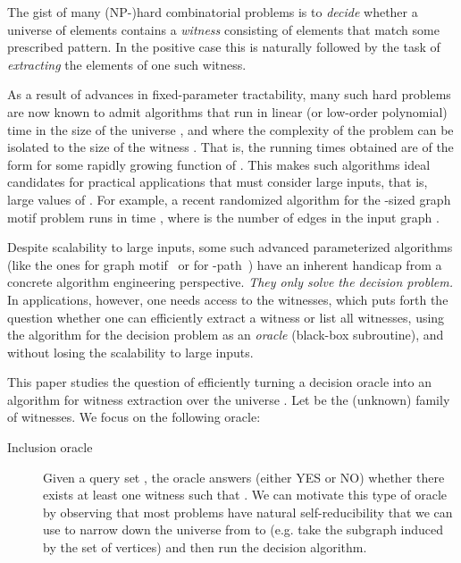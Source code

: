 \documentclass[11pt]{article}
\begin{document}
The gist of many (NP-)hard combinatorial problems is to {\em decide} 
whether a universe of  elements contains a {\em witness} consisting 
of  elements that match some prescribed pattern. In the positive case 
this is naturally followed by the task of {\em extracting} the elements 
of one such witness. 

As a result of advances in fixed-parameter tractability, 
many such hard problems are now known to admit algorithms that run
in linear (or low-order polynomial) time in the size of the universe
, and where the complexity of the problem can be isolated to
the size of the witness . That is, the running times obtained
are of the form  for some rapidly growing function 
 of . This makes such algorithms ideal candidates for 
practical applications that must consider large inputs, 
that is, large values of . For example, a recent randomized 
algorithm for the -sized graph motif problem runs in time 
, where  is the number of edges in 
the input graph \cite{BjorklundKaskiKowalik2013}. 

Despite scalability to large inputs, some such advanced parameterized 
algorithms (like the ones for graph motif~\cite{BjorklundKaskiKowalik2013} or for -path~\cite{BjorklundHusfeldtKaskiKoivisto2010}) have an inherent handicap from a concrete algorithm engineering
perspective. {\em They only solve the decision problem.}
In applications, however, one needs access to the witnesses,
which puts forth the question whether one can efficiently extract a
witness or list all witnesses, using the algorithm for the decision
problem as an {\em oracle} (black-box subroutine), and without losing 
the scalability to large inputs.

This paper studies the question of efficiently turning a decision oracle 
into an algorithm for witness extraction over the 
universe . Let  be the (unknown) family of witnesses. We focus on the following oracle:
\begin{description}
\item[Inclusion oracle]
Given a query set , the oracle answers (either YES or NO) 
whether there exists at least one witness  such that 
. We can motivate this type of oracle by observing
that most problems have natural self-reducibility that we can use 
to narrow down the universe from  to  (e.g. take the subgraph 
induced by the set  of vertices) and then run the decision algorithm.
\end{description}
\end{document}
